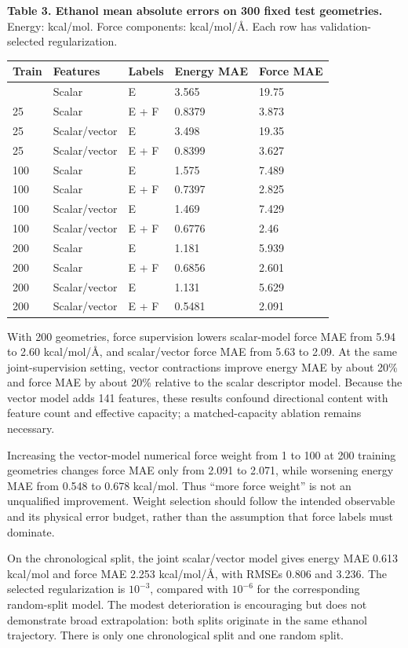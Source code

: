 \documentclass[
  11pt,
  a4paper,
]{article}
\begin{document}

\textbf{Table 3. Ethanol mean absolute errors on 300 fixed test
geometries.} Energy: kcal/mol. Force components: kcal/mol/Å. Each row
has validation-selected regularization.

\begin{longtable}[]{@{}lllll@{}}
\toprule\noalign{}
Train & Features & Labels & Energy MAE & Force MAE \\
\midrule\noalign{}
\endhead
\bottomrule\noalign{}
\endlastfoot
25 & Scalar & E & 3.565 & 19.75 \\
25 & Scalar & E + F & 0.8379 & 3.873 \\
25 & Scalar/vector & E & 3.498 & 19.35 \\
25 & Scalar/vector & E + F & 0.8399 & 3.627 \\
100 & Scalar & E & 1.575 & 7.489 \\
100 & Scalar & E + F & 0.7397 & 2.825 \\
100 & Scalar/vector & E & 1.469 & 7.429 \\
100 & Scalar/vector & E + F & 0.6776 & 2.46 \\
200 & Scalar & E & 1.181 & 5.939 \\
200 & Scalar & E + F & 0.6856 & 2.601 \\
200 & Scalar/vector & E & 1.131 & 5.629 \\
200 & Scalar/vector & E + F & 0.5481 & 2.091 \\
\end{longtable}

With 200 geometries, force supervision lowers scalar-model force MAE
from 5.94 to 2.60 kcal/mol/Å, and scalar/vector force MAE from 5.63 to
2.09. At the same joint-supervision setting, vector contractions improve
energy MAE by about 20\% and force MAE by about 20\% relative to the
scalar descriptor model. Because the vector model adds 141 features,
these results confound directional content with feature count and
effective capacity; a matched-capacity ablation remains necessary.

Increasing the vector-model numerical force weight from 1 to 100 at 200
training geometries changes force MAE only from 2.091 to 2.071, while
worsening energy MAE from 0.548 to 0.678 kcal/mol. Thus ``more force
weight'' is not an unqualified improvement. Weight selection should
follow the intended observable and its physical error budget, rather
than the assumption that force labels must dominate.

On the chronological split, the joint scalar/vector model gives energy
MAE 0.613 kcal/mol and force MAE 2.253 kcal/mol/Å, with RMSEs 0.806 and
3.236. The selected regularization is \(10^{-3}\), compared with
\(10^{-6}\) for the corresponding random-split model. The modest
deterioration is encouraging but does not demonstrate broad
extrapolation: both splits originate in the same ethanol trajectory.
There is only one chronological split and one random split.
\end{document}
